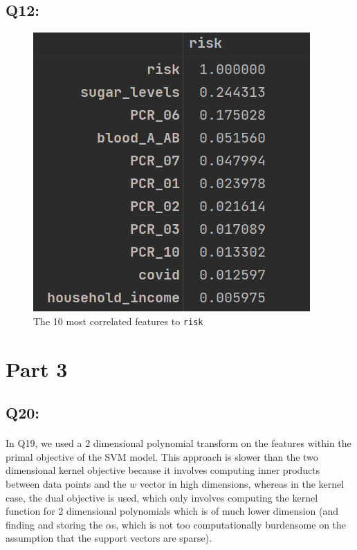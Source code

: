 \documentclass{article}
\newcommand{\code}[1]{\texttt{#1}}
\begin{document}
\subsection*{Q12:}
    \begin{figure}[H]
        \centering
        \includegraphics{images/q12.png}
        \caption{The 10 most correlated features to \code{risk}}
    \end{figure}
\section*{Part 3}
\subsection*{Q20:}
    \paragraph*{}
    In Q19, we used a 2 dimensional polynomial transform on the features within the primal objective of the SVM model. This approach is slower than the two dimensional kernel objective because it involves computing inner products between data points and the $w$ vector in high dimensions, whereas in the kernel case, the dual objective is used, which only involves computing the kernel function for 2 dimensional polynomials which is of much lower dimension (and finding and storing the $\alpha$s, which is not too computationally burdensome on the assumption that the support vectors are sparse).
\end{document}

